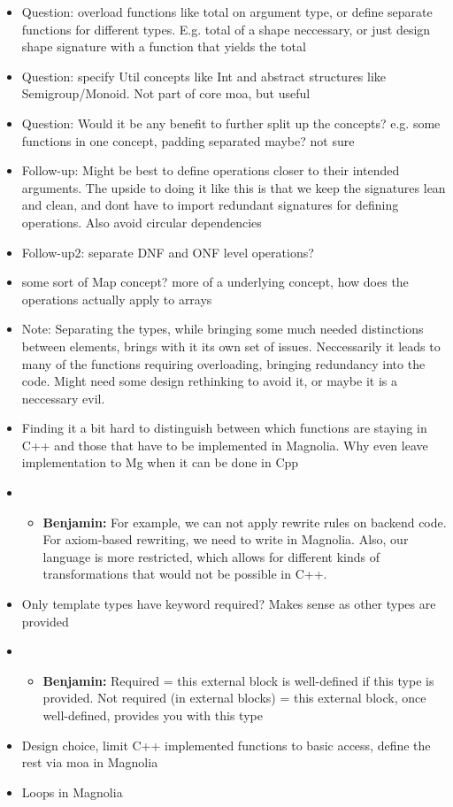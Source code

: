 \documentclass{article}
\begin{document}
\begin{itemize}
    \item Question: overload functions like total on argument type, or define separate functions for different types. E.g. total of a shape neccessary, or just design shape signature with a function that yields the total
    \item Question: specify Util concepts like Int and abstract structures like Semigroup/Monoid. Not part of core moa, but useful
    \item Question: Would it be any benefit to further split up the concepts? e.g. some functions in one concept, padding separated maybe? not sure
    \item Follow-up: Might be best to define operations closer to their intended arguments. The upside to doing it like this is that we keep the signatures lean and clean, and dont have to import redundant signatures for defining operations. Also avoid circular dependencies
    \item Follow-up2: separate DNF and ONF level operations?
    \item some sort of Map concept? more of a underlying concept, how does the operations actually apply to arrays
    \item Note: Separating the types, while bringing some much needed distinctions between elements, brings with it its own set of issues. Neccessarily it leads to many of the functions requiring overloading, bringing redundancy into the code. Might need some design rethinking to avoid it, or maybe it is a neccessary evil.
    \item Finding it a bit hard to distinguish between which functions are staying in C++ and those that have to be implemented in Magnolia. Why even leave implementation to Mg when it can be done in Cpp
    \item \begin{itemize}
        \item \textbf{Benjamin:} For example, we can not apply rewrite rules on backend code. For axiom-based rewriting, we need to write in Magnolia. Also, our language is more restricted, which allows for different kinds of transformations that would not be possible in C++.
    \end{itemize}
    \item Only template types have keyword required? Makes sense as other types are provided
    \item \begin{itemize}
        \item \textbf{Benjamin:} Required = this external block is well-defined if this type is provided. Not required (in external blocks) = this external block, once well-defined, provides you with this type
    \end{itemize}
    \item Design choice, limit C++ implemented functions to basic access, define the rest via moa in Magnolia
    \item Loops in Magnolia
\end{itemize}
\end{document}

